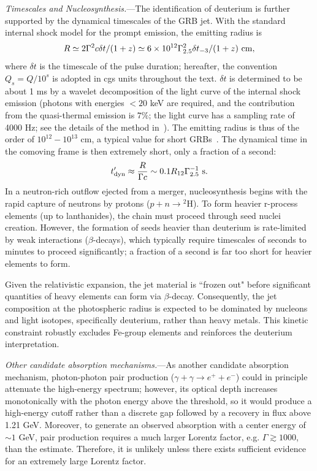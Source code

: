 \documentclass[linenumbers,twocolumn]{aastex631}
\begin{document}
\textit{Timescales and Nucleosynthesis.}---The identification of deuterium is further supported by the dynamical timescales of the GRB jet. %
With the standard internal shock model for the prompt emission, the emitting radius is~\citep{2011ApJ...726...90Z}
\begin{equation}\label{eq:Ris}
R \simeq 2 \Gamma^2 c \delta t/(1+z) \simeq 6 \times 10^{12} \Gamma_{2.5}^2 \delta t_{-3}/(1+z) \ {\rm cm},
\end{equation}
where $\delta t$ is the timescale of the pulse duration; hereafter, the convention $Q_s = Q/10^s$ is adopted in cgs units throughout the text. $\delta t$ is determined to be about 1 ms by a wavelet decomposition of the light curve of the internal shock emission (photons with energies $< 20$ keV are required, and the contribution from the quasi-thermal emission is $7\%$; the light curve has a sampling rate of 4000 Hz; see the details of the method in~\citealt{2013MNRAS.432..857M}). The emitting radius is thus of the order of $10^{12}-10^{13}$ cm, a typical value for short GRBs~\citep{2014ARA&A..52...43B}. The dynamical time in the comoving frame is then extremely short, only a fraction of a second:
\begin{equation}
t'_{\rm dyn} \approx \frac{R}{\Gamma c} \sim 0.1 R_{12} \Gamma_{2.5}^{-1} \text{ s}.
\end{equation}
In a neutron-rich outflow ejected from a merger, nucleosynthesis begins with the rapid capture of neutrons by protons ($p + n \rightarrow {^2\text{H}}$). To form heavier r-process elements (up to lanthanides), the chain must proceed through seed nuclei creation. However, the formation of seeds heavier than deuterium is rate-limited by weak interactions ($\beta$-decays), which typically require timescales of seconds to minutes to proceed significantly; a fraction of a second is far too short for heavier elements to form.

Given the relativistic expansion, the jet material is ``frozen out" before significant quantities of heavy elements can form via $\beta$-decay. Consequently, the jet composition at the photospheric radius is expected to be dominated by nucleons and light isotopes, specifically deuterium, rather than heavy metals. This kinetic constraint robustly excludes Fe-group elements and reinforces the deuterium interpretation.



\textit{Other candidate absorption mechanisms.}---As another candidate absorption mechanism, photon-photon pair production ($\gamma+\gamma \to
e^+ + e^-$) could in principle attenuate the high-energy spectrum; however, its optical depth increases monotonically with the photon energy above the threshold, so it would produce a high-energy cutoff rather than a discrete gap followed by a recovery in flux above 1.21 GeV. Moreover, to generate an observed absorption with a center energy of $\sim1$ GeV, pair production requires a much larger Lorentz factor, e.g. $\Gamma\gtrsim 1000$, than the estimate. Therefore, it is unlikely unless there exists sufficient evidence for an extremely large Lorentz factor.
\end{document}
